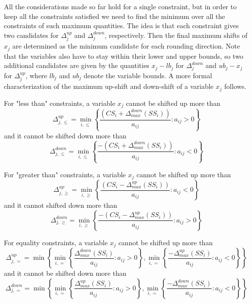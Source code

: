 \documentclass[a4paper,12pt,twoside]{scrbook}
\begin{document}
All the considerations made so far hold for a single constraint, but in order to keep all the constraints satisfied we need to find the minimum over all the constraints of such maximum quantities. The idea is that each constraint gives two candidates for $\Delta_{j}^{up}$ and $\Delta_{j}^{down}$, respectively. Then the final maximum shifts of $x_j$ are determined as the minimum candidate for each rounding direction. 
Note that the variables also have to stay within their lower and upper bounds, so two additional candidates are given by the quantities $x_j - lb_j$ for $\Delta_{j}^{down}$ and $ub_j - x_j$ for $\Delta_{j}^{up}$, where $lb_j$ and $ub_j$ denote the variable bounds.
A more formal characterization of the maximum up-shift and down-shift of a variable $x_j$ follows. \par

For "less than" constraints, a variable $x_j$ cannot be shifted up more than
\begin{equation}
	\Delta_{j,\leq}^{up} = \min_{i,\leq}\left\{\dfrac{(CS_i + \Delta_{max}^{down}(SS_i))}{a_{ij}} : a_{ij} > 0\right\}
\end{equation}
and it cannot be shifted down more than
\begin{equation}
	\Delta_{j,\leq}^{down} = \min_{i,\leq}\left\{\dfrac{-(CS_i + \Delta_{max}^{down}(SS_i))}{a_{ij}} : a_{ij} < 0\right\}
\end{equation}

For "greater than" constraints, a variable $x_j$ cannot be shifted up more than
\begin{equation}
	\Delta_{j,\geq}^{up} = \min_{i,\geq}\left\{\dfrac{(CS_i - \Delta_{max}^{up}(SS_i))}{a_{ij}} : a_{ij} < 0\right\}
\end{equation}
and it cannot shifted down more than
\begin{equation}
	\Delta_{j,\geq}^{down} = \min_{i,\geq}\left\{\dfrac{-(CS_i - \Delta_{max}^{up}(SS_i))}{a_{ij}} : a_{ij} > 0\right\}
\end{equation}

For equality constraints, a variable $x_j$ cannot be shifted up more than
\begin{equation}
	\Delta_{j,=}^{up} = \min \left\{ \min_{i,=}\left\{\dfrac{\Delta_{max}^{down}(SS_i)}{a_{ij}} : a_{ij} > 0\right\} , \min_{i,=}\left\{\dfrac{-\Delta_{max}^{up}(SS_i)}{a_{ij}} : a_{ij} < 0 \right\} \right\}
\end{equation}
and it cannot be shifted down more than
\begin{equation}
	\Delta_{j,=}^{down} = \min \left\{ \min_{i,=}\left\{\dfrac{\Delta_{max}^{up}(SS_i)}{a_{ij}} : a_{ij} > 0\right\} , \min_{i,=}\left\{\dfrac{-\Delta_{max}^{down}(SS_i)}{a_{ij}} : a_{ij} < 0 \right\} \right\}
\end{equation}
\end{document}
